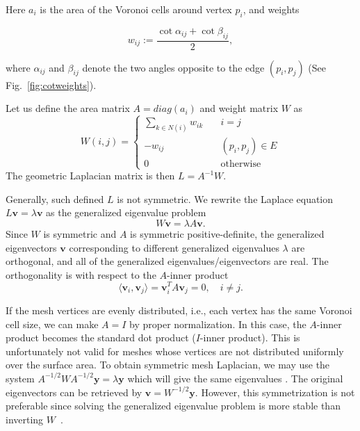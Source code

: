Here $a_i$ is the area of the Voronoi cells around vertex $p_i$, and weights

\begin{equation}
w_{ij}:=\frac{\cot\alpha_{ij}+\cot\beta_{ij}}{2},
\end{equation}

where $\alpha_{ij}$ and $\beta_{ij}$ denote the two angles opposite to the edge $(p_i,p_j)$
(See Fig.~\ref{fig:cotweights}).

Let us define the area matrix $A=diag(a_i)$ and weight matrix $W$ as
\begin{equation*}
W(i,j)=\left\{
       \begin{array}{lc}
        \sum_{k\in N(i)}w_{ik}\quad & i=j \\
        -w_{ij}\quad & (p_i,p_j)\in E \\
        0\quad & \text{otherwise}
    \end{array}
\right.
\end{equation*}
The geometric Laplacian matrix is then $L=A^{-1}W$.

Generally, such defined $L$ is not symmetric. We rewrite the Laplace equation $L\mathbf{v}=\lambda\mathbf{v}$ as the generalized eigenvalue problem
\begin{equation}
W\mathbf{v}=\lambda A\mathbf{v}.
\end{equation}
Since $W$ is symmetric and $A$ is symmetric positive-definite, the generalized eigenvectors $\mathbf{v}$ corresponding to different generalized eigenvalues $\lambda$ are orthogonal, and all of the generalized eigenvalues/eigenvectors are real. The orthogonality is with respect to the $A$-inner product
\begin{equation*}
\langle\mathbf{v}_i,\mathbf{v}_j\rangle=\mathbf{v}_i^T A\mathbf{v}_j=0,\quad i\neq j.
\end{equation*}

If the mesh vertices are evenly distributed, i.e., each vertex has the same Voronoi cell size, we can make $A=I$ by proper normalization. In this case, the $A$-inner product becomes the standard dot product ($I$-inner product). This is unfortunately not valid for meshes whose vertices are not distributed uniformly over the surface area. To obtain symmetric mesh Laplacian, we may use the system $A^{-1/2}WA^{-1/2}\mathbf{y}=\lambda\mathbf{y}$ which will give the same eigenvalues \cite{Vallet2008}. The original eigenvectors can be retrieved by $\mathbf{v}=W^{-1/2}\mathbf{y}$. However, this symmetrization is not preferable since solving the generalized eigenvalue problem is more stable than inverting $W$~\cite{Reuter:CG:2009}.

